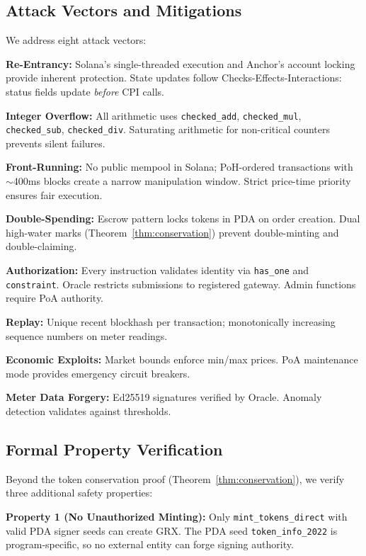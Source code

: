 \documentclass[conference]{IEEEtran}
\begin{document}
\subsection{Attack Vectors and Mitigations}

We address eight attack vectors:

\textbf{Re-Entrancy:} Solana's single-threaded execution and Anchor's account locking provide inherent protection. State updates follow Checks-Effects-Interactions: status fields update \textit{before} CPI calls.

\textbf{Integer Overflow:} All arithmetic uses \texttt{checked\_add}, \texttt{checked\_mul}, \texttt{checked\_sub}, \texttt{checked\_div}. Saturating arithmetic for non-critical counters prevents silent failures.

\textbf{Front-Running:} No public mempool in Solana; PoH-ordered transactions with $\sim$400ms blocks create a narrow manipulation window. Strict price-time priority ensures fair execution.

\textbf{Double-Spending:} Escrow pattern locks tokens in PDA on order creation. Dual high-water marks (Theorem~\ref{thm:conservation}) prevent double-minting and double-claiming.

\textbf{Authorization:} Every instruction validates identity via \texttt{has\_one} and \texttt{constraint}. Oracle restricts submissions to registered gateway. Admin functions require PoA authority.

\textbf{Replay:} Unique recent blockhash per transaction; monotonically increasing sequence numbers on meter readings.

\textbf{Economic Exploits:} Market bounds enforce min/max prices. PoA maintenance mode provides emergency circuit breakers.

\textbf{Meter Data Forgery:} Ed25519 signatures verified by Oracle. Anomaly detection validates against thresholds.

\subsection{Formal Property Verification}

Beyond the token conservation proof (Theorem~\ref{thm:conservation}), we verify three additional safety properties:

\textbf{Property 1 (No Unauthorized Minting):} Only \texttt{mint\_tokens\_direct} with valid PDA signer seeds can create GRX. The PDA seed \texttt{token\_info\_2022} is program-specific, so no external entity can forge signing authority.
\end{document}
